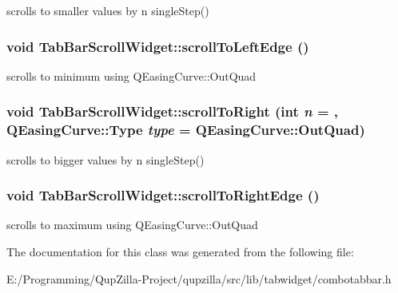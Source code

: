 scrolls to smaller values by n singleStep() 

\hypertarget{class_tab_bar_scroll_widget_aef9cc5e3e46b87fa9a039e62cdadc999}{
\subsubsection[{scrollToLeftEdge}]{\setlength{\rightskip}{0pt plus 5cm}void TabBarScrollWidget::scrollToLeftEdge ()}}
\label{class_tab_bar_scroll_widget_aef9cc5e3e46b87fa9a039e62cdadc999}


scrolls to minimum using QEasingCurve::OutQuad 

\hypertarget{class_tab_bar_scroll_widget_aae5b0963318e3b84a301df74fcfceb3e}{
\subsubsection[{scrollToRight}]{\setlength{\rightskip}{0pt plus 5cm}void TabBarScrollWidget::scrollToRight (int {\em n} = {}, \/  QEasingCurve::Type {\em type} = {\ttfamily QEasingCurve::OutQuad})}}
\label{class_tab_bar_scroll_widget_aae5b0963318e3b84a301df74fcfceb3e}


scrolls to bigger values by n singleStep() 

\hypertarget{class_tab_bar_scroll_widget_a8c700b63b084d5fec121ff07061763f6}{
\subsubsection[{scrollToRightEdge}]{\setlength{\rightskip}{0pt plus 5cm}void TabBarScrollWidget::scrollToRightEdge ()}}
\label{class_tab_bar_scroll_widget_a8c700b63b084d5fec121ff07061763f6}


scrolls to maximum using QEasingCurve::OutQuad 



The documentation for this class was generated from the following file:\begin{DoxyCompactItemize}
\item 
E:/Programming/QupZilla-\/Project/qupzilla/src/lib/tabwidget/combotabbar.h\end{DoxyCompactItemize}
